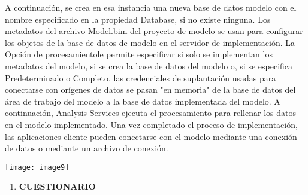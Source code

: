 \documentclass{article} %
\begin{document}
\noindent A continuaci\'{o}n, se crea en esa instancia una nueva base de datos modelo con el nombre especificado en la propiedad Database, si no existe ninguna. Los metadatos del archivo Model.bim del proyecto de modelo se usan para configurar los objetos de la base de datos de modelo en el servidor de implementaci\'{o}n. La Opci\'{o}n de procesamientole permite especificar si solo se implementan los metadatos del modelo, si se crea la base de datos del modelo o, si se especifica Predeterminado o Completo, las credenciales de suplantaci\'{o}n usadas para conectarse con or\'{i}genes de datos se pasan "en memoria" de la base de datos del \'{a}rea de trabajo del modelo a la base de datos implementada del modelo. A continuaci\'{o}n, Analysis Services ejecuta el procesamiento para rellenar los datos en el modelo implementado. Una vez completado el proceso de implementaci\'{o}n, las aplicaciones cliente pueden conectarse con el modelo mediante una conexi\'{o}n de datos o mediante un archivo de conexi\'{o}n.

\noindent 

\noindent 

\noindent 

\noindent \texttt{[image: image9]}

\noindent 

\noindent 

\noindent 

\noindent 

\noindent 

\noindent 

\noindent 

\noindent 

\noindent \textbf{}

\noindent \textbf{}

\noindent \textbf{}

\noindent \textbf{}

\noindent \textbf{}

\noindent \textbf{}

\noindent \textbf{}

\noindent \textbf{}

\noindent \textbf{}

\noindent \textbf{}

\noindent \textbf{}

\noindent 

\noindent 

\begin{enumerate}
\item  \textbf{CUESTIONARIO} 
\end{enumerate}
\end{document}
